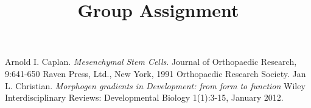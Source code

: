 \documentclass[12pt]{article}
\title{Group Assignment}
\begin{document}
\maketitle











\begin{thebibliography}{}
	Arnold I. Caplan. 
	\textit{Mesenchymal Stem Cells}. 
	Journal of Orthopaedic Research, 9:641-650 Raven Press, Ltd., New York, 1991 Orthopaedic Research Society.
	Jan L. Christian.
	\textit{Morphogen gradients in Development: from form to function}
	 Wiley Interdisciplinary Reviews: Developmental Biology 1(1):3-15, January 2012.

\end{thebibliography}
\end{document}
